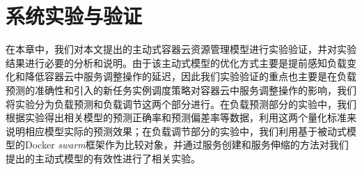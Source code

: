 
\chapter{系统实验与验证}\label{chap:sys_eval}
在本章中，我们对本文提出的主动式容器云资源管理模型进行实验验证，并对实验结果进行必要的分析和说明。由于该主动式模型的优化方式主要是提前感知负载变化和降低容器云中服务调整操作的延迟，因此我们实验验证的重点也主要是在负载预测的准确性和引入的新任务实例调度策略对容器云中服务调整操作的影响，我们将实验分为负载预测和负载调节这两个部分进行。在负载预测部分的实验中，我们根据实验得出相关模型的预测正确率和预测偏差率等数据，利用这两个量化标准来说明相应模型实际的预测效果；在负载调节部分的实验中，我们利用基于被动式模型的Docker \emph{swarm}框架作为比较对象，并通过服务创建和服务伸缩的方法对我们提出的主动式模型的有效性进行了相关实验。

